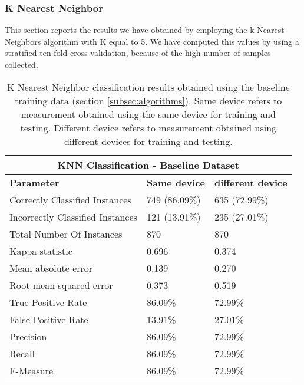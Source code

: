 \subsubsection{K Nearest Neighbor}
This section reports the results we have obtained by employing the k-Nearest Neighbors algorithm with K equal to 5.
We have computed this values by using a stratified ten-fold cross validation, because of the high number of samples collected.

\begin{table}
\caption[K Nearest Neighbor classification results obtained using the baseline training data.]{K Nearest Neighbor classification results obtained using the baseline training data (section \ref{subsec:algorithms}). Same device refers to measurement obtained using the same device for training and testing. Different device refers to measurement obtained using different devices for training and testing.}
\label{tab:knn-baseline}
\begin{tabular}{ |l|l|l| }
  \hline
  \multicolumn{3}{|c|}{\textbf{KNN Classification - Baseline Dataset}} \\
  \hline
  \textbf{Parameter} & \textbf{Same device} & \textbf{different device}\\
  \hline
  Correctly Classified Instances & 749 (86.09\%) & 635 (72.99\%) \\
  Incorrectly Classified Instances & 121 (13.91\%) & 235 (27.01\%) \\
  Total Number Of Instances & 870 & 870 \\
  Kappa statistic & 0.696 & 0.374 \\
  Mean absolute error & 0.139 & 0.270 \\
  Root mean squared error & 0.373 & 0.519 \\
  True Positive Rate & 86.09\% & 72.99\% \\
  False Positive Rate & 13.91\% & 27.01\% \\
  Precision & 86.09\% & 72.99\% \\
  Recall & 86.09\% & 72.99\% \\
  F-Measure & 86.09\% & 72.99\% \\
  \hline
\end{tabular}
\end{table}

